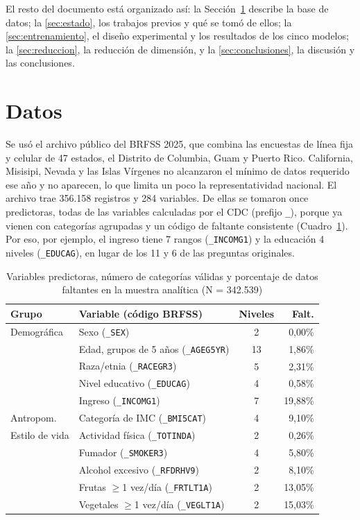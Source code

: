 El resto del documento está organizado así: la Sección~\ref{sec:datos} describe la base de datos; la \ref{sec:estado}, los trabajos previos y qué se tomó de ellos; la \ref{sec:entrenamiento}, el diseño experimental y los resultados de los cinco modelos; la \ref{sec:reduccion}, la reducción de dimensión, y la \ref{sec:conclusiones}, la discusión y las conclusiones.

\section{Datos}\label{sec:datos}
Se usó el archivo público del BRFSS 2025, que combina las encuestas de línea fija y celular de 47 estados, el Distrito de Columbia, Guam y Puerto Rico. California, Misisipi, Nevada y las Islas Vírgenes no alcanzaron el mínimo de datos requerido ese año y no aparecen, lo que limita un poco la representatividad nacional. El archivo trae 356.158 registros y 284 variables. De ellas se tomaron once predictoras, todas de las variables calculadas por el CDC (prefijo \texttt{\_}), porque ya vienen con categorías agrupadas y un código de faltante consistente (Cuadro~\ref{tab:variables}). Por eso, por ejemplo, el ingreso tiene 7 rangos (\texttt{\_INCOMG1}) y la educación 4 niveles (\texttt{\_EDUCAG}), en lugar de los 11 y 6 de las preguntas originales.

\begin{table}[!t]
\centering
\caption{Variables predictoras, número de categorías válidas y porcentaje de datos faltantes en la muestra analítica (N = 342.539)}
\label{tab:variables}
\footnotesize
\setlength{\tabcolsep}{3pt}
\begin{tabular}{@{}llcr@{}}
\toprule
\textbf{Grupo} & \textbf{Variable (código BRFSS)} & \textbf{Niveles} & \textbf{Falt.} \\
\midrule
Demográfica & Sexo (\texttt{\_SEX}) & 2 & 0,00\% \\
 & Edad, grupos de 5 años (\texttt{\_AGEG5YR}) & 13 & 1,86\% \\
 & Raza/etnia (\texttt{\_RACEGR3}) & 5 & 2,31\% \\
 & Nivel educativo (\texttt{\_EDUCAG}) & 4 & 0,58\% \\
 & Ingreso (\texttt{\_INCOMG1}) & 7 & 19,88\% \\
Antropom. & Categoría de IMC (\texttt{\_BMI5CAT}) & 4 & 9,10\% \\
Estilo de vida & Actividad física (\texttt{\_TOTINDA}) & 2 & 0,26\% \\
 & Fumador (\texttt{\_SMOKER3}) & 4 & 5,80\% \\
 & Alcohol excesivo (\texttt{\_RFDRHV9}) & 2 & 8,10\% \\
 & Frutas $\geq$1 vez/día (\texttt{\_FRTLT1A}) & 2 & 13,05\% \\
 & Vegetales $\geq$1 vez/día (\texttt{\_VEGLT1A}) & 2 & 15,03\% \\
\bottomrule
\end{tabular}
\end{table}

